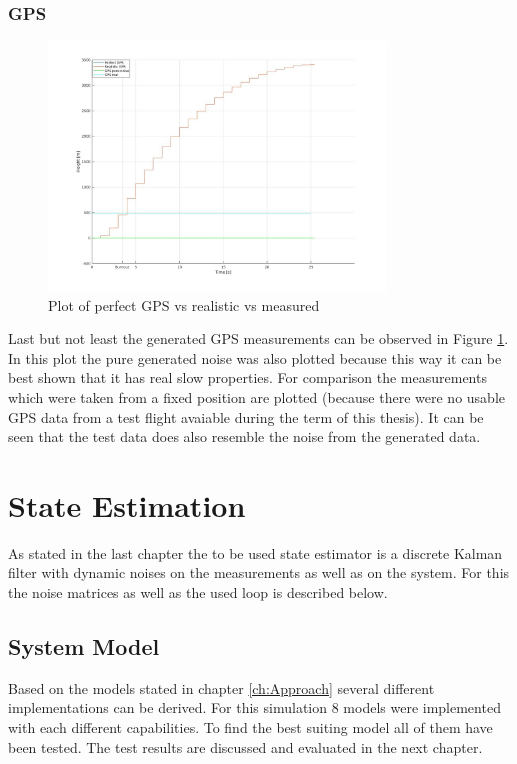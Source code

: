 \subsubsection{GPS}
\begin{figure}[h!]
 \centering
 \includegraphics[width=0.8\textwidth]{./Pictures/GPSPerfVSReal.jpg}
 \caption{Plot of perfect GPS vs realistic vs measured}
 \label{fig:GPSPerfVSReal}
\end{figure}
Last but not least the generated GPS measurements can be observed in Figure \ref{fig:GPSPerfVSReal}.
In this plot the pure generated noise was also plotted because this way it can be best shown that it has real slow properties.
For comparison the measurements which were taken from a fixed position are plotted (because there were no usable GPS data from a test flight avaiable during the term of this thesis).
It can be seen that the test data does also resemble the noise from the generated data.


\section{State Estimation}
As stated in the last chapter the to be used state estimator is a discrete Kalman filter with dynamic noises on the measurements as well as on the system.
For this the noise matrices as well as the used loop is described below.

\subsection{System Model}
Based on the models stated in chapter \ref{ch:Approach} several different implementations can be derived.
For this simulation 8 models were implemented with each different capabilities.
To find the best suiting model all of them have been tested. The test results are discussed and evaluated in the next chapter.
